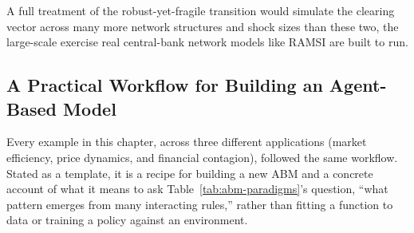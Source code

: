 \documentclass[../ai_in_finance]{subfiles}
\begin{document}
A full treatment of the robust-yet-fragile transition would simulate the clearing vector across many more network structures and shock sizes than these two, the large-scale exercise real central-bank network models like RAMSI are built to run.

\subsection{A Practical Workflow for Building an Agent-Based Model}
\label{sec:abm-workflow}

Every example in this chapter, across three different applications (market efficiency, price dynamics, and financial contagion), followed the same workflow. Stated as a template, it is a recipe for building a new ABM and a concrete account of what it means to ask Table~\ref{tab:abm-paradigms}'s question, ``what pattern emerges from many interacting rules,'' rather than fitting a function to data or training a policy against an environment.
\end{document}
